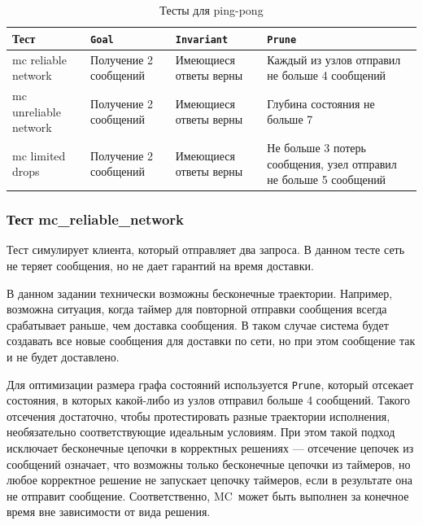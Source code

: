 \documentclass[a4paper,12pt]{extarticle}
\newcommand{\goal}[0]{\texttt{Goal}}
\newcommand{\prune}[0]{\texttt{Prune}}
\newcommand{\invariant}[0]{\texttt{Invariant}}
\newcommand{\mc}[0]{MC}
\begin{document}
\begin{table}[htbp]
    \caption{Тесты для ping-pong}
    \begin{center}
    \begin{tabular}{|p{}|p{}|p{}|p{}|}
    \hline
    Тест & \goal & \invariant & \prune \\
    \hline
    mc reliable network & Получение 2 сообщений & Имеющиеся ответы верны & Каждый из узлов отправил не больше 4 сообщений  \\
    \hline
    mc unreliable network  & Получение 2 сообщений & Имеющиеся ответы верны & Глубина состояния не больше 7  \\
    \hline
    mc limited drops  & Получение 2 сообщений & Имеющиеся ответы верны & Не больше 3 потерь сообщения, узел отправил не больше 5 сообщений \\
    \hline
    \end{tabular}
    \label{testspingpong}
    \end{center}
\end{table}

\subsubsection{Тест mc\_reliable\_network}
\label{ping_pong_test_1}

Тест симулирует клиента, который отправляет два запроса.
В данном тесте сеть не теряет сообщения, но не дает гарантий на время доставки.

В данном задании технически возможны бесконечные траектории.
Например, возможна ситуация, когда таймер для повторной отправки сообщения всегда срабатывает раньше, чем доставка сообщения.
В таком случае система будет создавать все новые сообщения для доставки по сети, но при этом сообщение так и не будет доставлено.

Для оптимизации размера графа состояний используется \prune, который отсекает состояния, в которых какой-либо из узлов отправил больше 4 сообщений.
Такого отсечения достаточно, чтобы протестировать разные траектории исполнения, необязательно соответствующие идеальным условиям.
При этом такой подход исключает бесконечные цепочки в корректных решениях --- отсечение цепочек из сообщений означает, что возможны только бесконечные цепочки из таймеров, но любое корректное решение не запускает цепочку таймеров, если в результате она не отправит сообщение.
Соответственно, \mc\ может быть выполнен за конечное время вне зависимости от вида решения.
\end{document}
